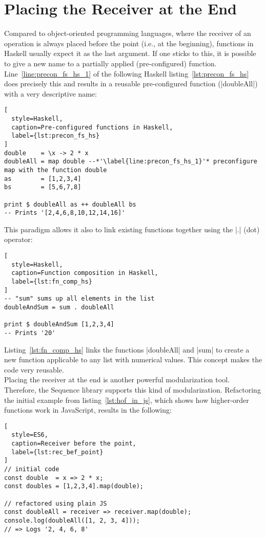 \section{Placing the Receiver at the End} %
\label{sec:Placing the Receiver at the End}
Compared to object-oriented programming languages, where the receiver of an
operation is always placed before the point (i.e., at the beginning), functions
in Haskell usually expect it as the last argument. If one sticks to this, it is
possible to give a new name to a partially applied (pre-configured)
function. Line~\ref{line:precon_fs_hs_1} of the following Haskell
listing~\ref{lst:precon_fs_hs} does precisely this and results in a reusable
pre-configured function (|doubleAll|) with a very descriptive name:
\begin{lstlisting}[
  style=Haskell,
  caption=Pre-configured functions in Haskell,
  label={lst:precon_fs_hs}
]
double    = \x -> 2 * x
doubleAll = map double --*'\label{line:precon_fs_hs_1}'* preconfigure map with the function double
as        = [1,2,3,4]
bs        = [5,6,7,8]

print $ doubleAll as ++ doubleAll bs
-- Prints '[2,4,6,8,10,12,14,16]'
\end{lstlisting}

This paradigm allows it also to link existing functions together using the |.|
(dot) operator:

\begin{lstlisting}[
  style=Haskell,
  caption=Function composition in Haskell,
  label={lst:fn_comp_hs}
]
-- "sum" sums up all elements in the list
doubleAndSum = sum . doubleAll

print $ doubleAndSum [1,2,3,4]
-- Prints '20'
\end{lstlisting}

Listing~\ref{lst:fn_comp_hs} links the functions |doubleAll| and |sum| to
create a new function applicable to any list with numerical values. This
concept makes the code very reusable.\\
Placing the receiver at the end is another powerful modularization
tool. Therefore, the Sequence library supports this kind of modularization.
Refactoring the initial example from listing~\ref{lst:hof_in_js}, which 
shows how higher-order functions work in JavaScript, results in the following:

\begin{lstlisting}[
  style=ES6,
  caption=Receiver before the point,
  label={lst:rec_bef_point}
]
// initial code
const double  = x => 2 * x;
const doubles = [1,2,3,4].map(double);

// refactored using plain JS
const doubleAll = receiver => receiver.map(double);
console.log(doubleAll([1, 2, 3, 4]));
// => Logs '2, 4, 6, 8'
\end{lstlisting}

